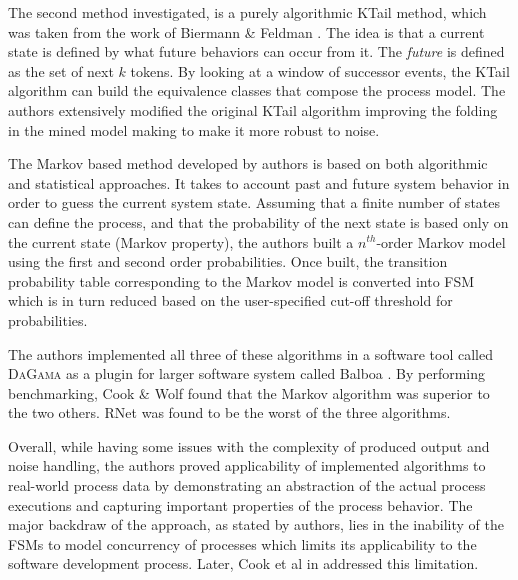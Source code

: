The second method investigated, is a purely algorithmic KTail method, which was taken from the work of Biermann \& Feldman \cite{citeulike:5120603}. The idea is that a current state is defined by what future behaviors can occur from it. The \textit{future} is defined as the set of next $k$ tokens. By looking at a window of successor events, the KTail algorithm can build the equivalence classes that compose the process model. The authors extensively modified the original KTail algorithm improving the folding in the mined model making to make it more robust to noise.

The Markov based method developed by authors is based on both algorithmic and statistical approaches. It takes to account past and future system behavior in order to guess the current system state. Assuming that a finite number of states can define the process, and that the probability of the next state is based only on the current state (Markov property), the authors built a $n^{th}$-order Markov model using the first and second order probabilities. Once built, the transition probability table corresponding to the Markov model is converted into FSM which is in turn reduced based on the user-specified cut-off threshold for probabilities.

The authors implemented all three of these algorithms in a software tool called \textsc{DaGama} as a plugin for larger software system called Balboa \cite{citeulike:5120757}. By performing benchmarking, Cook \& Wolf found that the Markov algorithm was superior to the two others. RNet was found to be the worst of the three algorithms. 

Overall, while having some issues with the complexity of produced output and noise handling, the authors proved applicability of implemented algorithms to real-world process data by demonstrating an abstraction of the actual process executions and capturing important properties of the process behavior. The major backdraw of the approach, as stated by authors, lies in the inability of the FSMs to model concurrency of processes which limits its applicability to the software development process. Later, Cook et al in \cite{citeulike:5128143} addressed this limitation.
